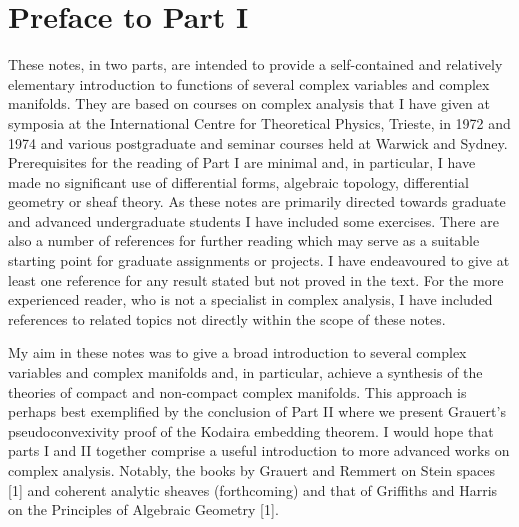 \chapter*{Preface to Part I}
These notes, in two parts, are intended to provide a self-contained and relatively elementary introduction to functions of several complex variables and complex manifolds. They are based on courses on complex analysis that I have given at symposia at the International Centre for Theoretical Physics, Trieste, in 1972 and 1974 and various postgraduate and seminar courses held at Warwick and Sydney. Prerequisites for the reading of Part I are minimal and, in particular, I have made no significant use of differential forms, algebraic topology, differential geometry or sheaf theory. As these notes are primarily directed towards graduate and advanced undergraduate students I have included some exercises. There are also a number of references for further reading which may serve as a suitable starting point for graduate assignments or projects. I have endeavoured to give at least one reference for any result stated but not proved in the text. For the more experienced reader, who is not a specialist in complex analysis, I have included references to related topics not directly within the scope of these notes.

My aim in these notes was to give a broad introduction to several complex variables and complex manifolds and, in particular, achieve a synthesis of the theories of compact and non-compact complex manifolds. This approach is perhaps best exemplified by the conclusion of Part II where we present Grauert's pseudoconvexivity proof of the Kodaira embedding theorem. I would hope that parts I and II together comprise a useful introduction to more advanced works on complex analysis. Notably, the books by Grauert and Remmert on Stein spaces [1] and coherent analytic sheaves (forthcoming) and that of Griffiths and Harris on the Principles of Algebraic Geometry [1].

